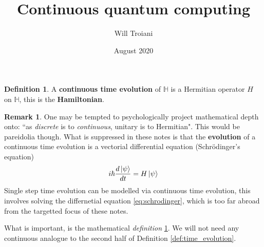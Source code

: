 \documentclass[12pt]{article}
\title{Continuous quantum computing}
\author{Will Troiani}
\date{August 2020}
\theoremstyle{plain}
\theoremstyle{definition}
\newtheorem{defn}[thm]{Definition} %
\newtheorem{remark}[thm]{Remark}
\newcommand{\bb}[1]{\mathbb{#1}}
\begin{document}
	\maketitle

\begin{defn}\label{def:cont_time_evolution}
	A \textbf{continuous time evolution} of $\bb{H}$ is a Hermitian operator $H$ on $\bb{H}$, this is the \textbf{Hamiltonian}.
\end{defn}

\begin{remark}
	One may be tempted to psychologically project mathematical depth onto: ``as \emph{discrete} is to \emph{continuous}, unitary is to Hermitian". This would be pareidolia though. What is suppressed in these notes is that the \textbf{evolution} of a continuous time evolution is a vectorial differential equation (Schr\"{o}dinger's equation)
	\begin{equation}\label{eq:schrodinger}
		i\hbar \frac{d\ket{\psi}}{dt} = H\ket{\psi}
	\end{equation}
	Single step time evolution can be modelled via continuous time evolution, this involves solving the differnetial equation \eqref{eq:schrodinger}, which is too far abroad from the targetted focus of these notes.
	
	What is important, is the mathematical \emph{definition} \ref{def:cont_time_evolution}. We will not need any continuous analogue to the second half of Definition \ref{def:time_evolution}.
\end{remark}
\end{document}

